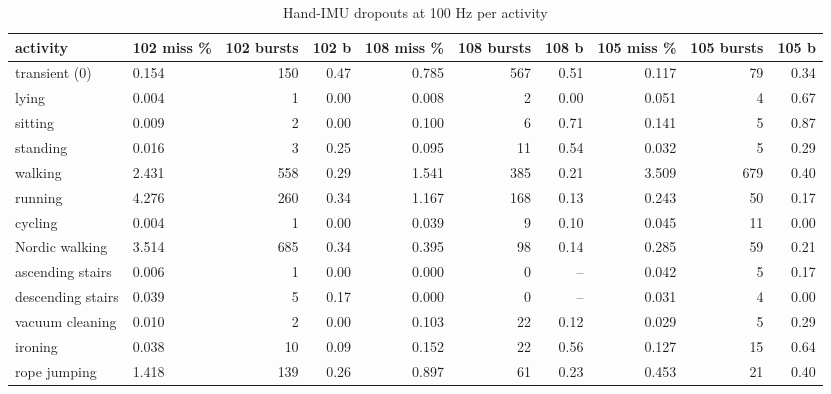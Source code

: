 \begin{table}[ht]
\centering
\small
\begin{tabular}{llrrrrrrrr}
\toprule
activity & 102 miss \% & 102 bursts & 102 b & 108 miss \% & 108 bursts & 108 b & 105 miss \% & 105 bursts & 105 b \\
\midrule
transient (0) & 0.154 & 150 & 0.47 & 0.785 & 567 & 0.51 & 0.117 & 79 & 0.34 \\
lying & 0.004 & 1 & 0.00 & 0.008 & 2 & 0.00 & 0.051 & 4 & 0.67 \\
sitting & 0.009 & 2 & 0.00 & 0.100 & 6 & 0.71 & 0.141 & 5 & 0.87 \\
standing & 0.016 & 3 & 0.25 & 0.095 & 11 & 0.54 & 0.032 & 5 & 0.29 \\
walking & 2.431 & 558 & 0.29 & 1.541 & 385 & 0.21 & 3.509 & 679 & 0.40 \\
running & 4.276 & 260 & 0.34 & 1.167 & 168 & 0.13 & 0.243 & 50 & 0.17 \\
cycling & 0.004 & 1 & 0.00 & 0.039 & 9 & 0.10 & 0.045 & 11 & 0.00 \\
Nordic walking & 3.514 & 685 & 0.34 & 0.395 & 98 & 0.14 & 0.285 & 59 & 0.21 \\
ascending stairs & 0.006 & 1 & 0.00 & 0.000 & 0 & -- & 0.042 & 5 & 0.17 \\
descending stairs & 0.039 & 5 & 0.17 & 0.000 & 0 & -- & 0.031 & 4 & 0.00 \\
vacuum cleaning & 0.010 & 2 & 0.00 & 0.103 & 22 & 0.12 & 0.029 & 5 & 0.29 \\
ironing & 0.038 & 10 & 0.09 & 0.152 & 22 & 0.56 & 0.127 & 15 & 0.64 \\
rope jumping & 1.418 & 139 & 0.26 & 0.897 & 61 & 0.23 & 0.453 & 21 & 0.40 \\
\bottomrule
\end{tabular}
\caption{Hand-IMU dropouts at 100 Hz per activity}
\end{table}
